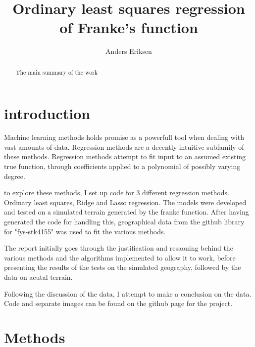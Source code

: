 \documentclass[ 12pt, a4paper ]{article}
\title{Ordinary least squares regression of Franke's function}
\author{Anders Eriksen}
\date{}
\begin{document}
\maketitle
\tableofcontents
\begin{abstract}
    The main summary of the work
\end{abstract}

\section{introduction}

Machine learning methods holds promise as a powerfull tool when dealing with vast amounts of 
data. Regression methods are a decently intuitive subfamily of these methods. Regression methods 
attempt to fit input to an assumed existing true function, through coefficients applied to a 
polynomial of possibly varying degree. 

to explore these methods, I set up code for 3 different regression methods. Ordinary least 
squares, Ridge and Lasso regression. The models were developed and tested on a simulated terrain
generated by the franke function. After having generated the code for handling this, geographical
data from the github library for "fys-stk4155" was used to fit the various methods. 

The report initially goes through the justification and resaoning behind the various methods and
the algorithms implemented to allow it to work, before presenting the results of the tests on the
simulated geography, followed by the data on acutal terrain. 

Following the discussion of the data, I attempt to make a conclusion on the data. Code and 
separate images can be found on the github page for the project.

\section{Methods}
\end{document}
